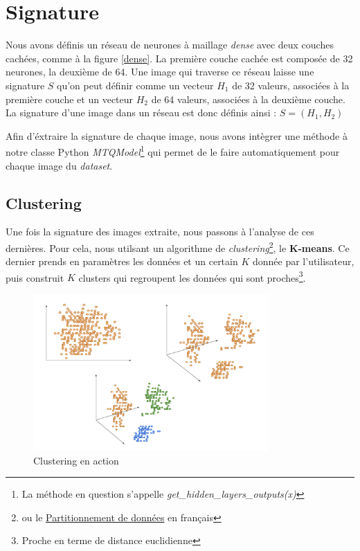 \documentclass[oneside,13pt,a4paper]{report}
\begin{document}
\section{Signature}

Nous avons définis un réseau de neurones à maillage \textit{dense} avec deux couches cachées, comme à la figure \ref{dense}. La première couche cachée est composée de 32 neurones, la deuxième de 64. Une image qui traverse ce réseau laisse une signature $S$ qu'on peut définir comme un vecteur $H_1$ de 32 valeurs, associées à la première couche et un vecteur $H_2$ de 64 valeurs, associées à la deuxième couche. La signature d'une image dans un réseau est donc définis ainsi : $ S = (H_1, H_2)$

Afin d'éxtraire la signature de chaque image, nous avons intègrer une méthode à notre classe Python \textit{MTQModel}\footnote{La méthode en question s'appelle \textit{get\_hidden\_layers\_outputs(x)}} qui permet de le faire automatiquement pour chaque image du \textit{dataset}.

\subsection{Clustering}

Une fois la signature des images extraite, nous passons à l'analyse de ces dernières. Pour cela, nous utilsant un algorithme de \textit{clustering}\footnote{ou le \href{https://fr.wikipedia.org/wiki/Partitionnement_de_donn\%C3\%A9es}{Partitionnement de données} en français}, le \textbf{K-means}. Ce dernier prends en paramètres les données et un certain $K$ donnée par l'utilisateur, puis construit $K$ clusters qui regroupent les données qui sont proches\footnote{Proche en terme de distance euclidienne}.

\begin{figure}[!h]
	\center
	\includegraphics[width=0.8\textwidth]{img/kmeans.png}
	\caption{Clustering en action}
\end{figure}
\end{document}
